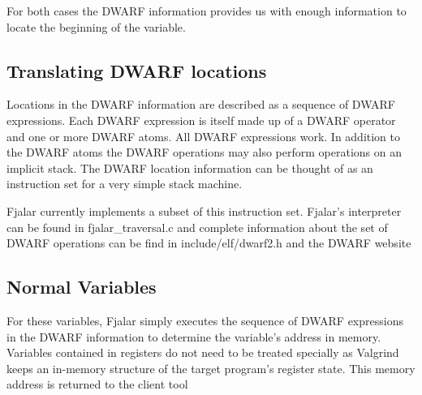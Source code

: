 \documentclass[11pt]{report}
\begin{document}
For both cases the DWARF information provides us with enough
information to locate the beginning of the variable.

\subsection{Translating DWARF locations}
Locations in the DWARF information are described as a sequence of
DWARF expressions. Each DWARF expression is itself made up of a DWARF
operator and one or more DWARF atoms. All DWARF expressions work. In
addition to the DWARF atoms the DWARF operations may also perform
operations on an implicit stack. The DWARF location information can be
thought of as an instruction set for a very simple stack machine.

Fjalar currently implements a subset of this instruction set. Fjalar's
interpreter can be found in fjalar\_traversal.c and complete
information about the set of DWARF operations can be find in
include/elf/dwarf2.h and the DWARF website %

\subsection{Normal Variables}
For these variables, Fjalar simply executes the sequence of DWARF
expressions in the DWARF information to determine the variable's
address in memory. Variables contained in registers do not need to be treated
specially as Valgrind keeps an in-memory structure of the target
program's register state. This memory address is returned to the
client tool




\end{document}
